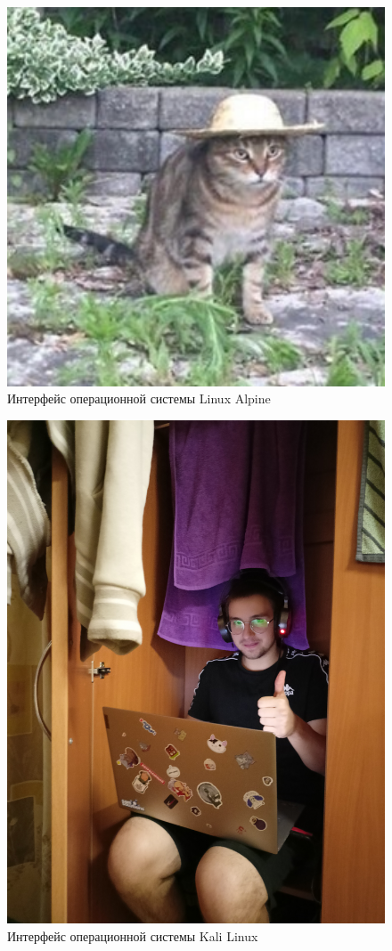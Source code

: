 \begin{figure}[H]
  \centering
  \includegraphics[width=1\textwidth]{resources/6.png}
  \caption{Интерфейс операционной системы Linux Alpine}
  \label{Linux2}
\end{figure}
\begin{figure}[H]
  \centering
  \includegraphics[width=1\textwidth]{resources/7.jpg}
  \caption{Интерфейс операционной системы Kali Linux}
  \label{Kali}
\end{figure}

